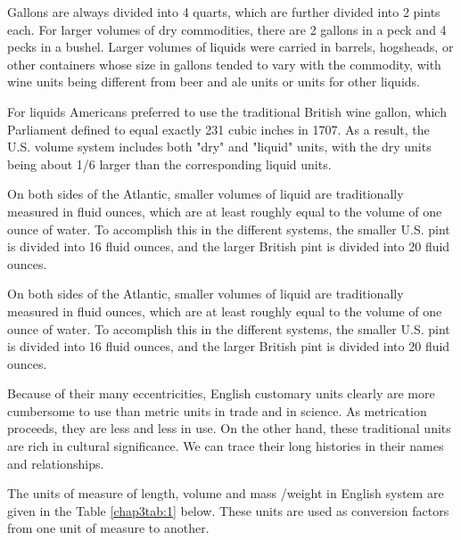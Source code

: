 Gallons are always divided into 4 quarts, which are further divided into 2 pints each.
For larger volumes of dry commodities, there are 2 gallons in a peck and 4 pecks in a bushel.
Larger volumes of liquids were carried in barrels, hogsheads, or other containers whose size
in gallons tended to vary with the commodity, with wine units being different from beer and
ale units or units for other liquids.

For liquids Americans preferred to use the traditional British wine gallon, which
Parliament defined to equal exactly 231 cubic inches in 1707. As a result, the U.S. volume
system includes both "dry" and "liquid" units, with the dry units being about 1/6 larger than
the corresponding liquid units.

On both sides of the Atlantic, smaller volumes of liquid are traditionally measured in
fluid ounces, which are at least roughly equal to the volume of one ounce of water. To
accomplish this in the different systems, the smaller U.S. pint is divided into 16 fluid ounces,
and the larger British pint is divided into 20 fluid ounces.

On both sides of the Atlantic, smaller volumes of liquid are traditionally measured in
fluid ounces, which are at least roughly equal to the volume of one ounce of water. To
accomplish this in the different systems, the smaller U.S. pint is divided into 16 fluid ounces,
and the larger British pint is divided into 20 fluid ounces.

Because of their many eccentricities, English customary units clearly are more
cumbersome to use than metric units in trade and in science. As metrication proceeds, they
are less and less in use. On the other hand, these traditional units are rich in cultural
significance. We can trace their long histories in their names and relationships.

The units of measure of length, volume and mass /weight in English system are given
in the Table \eqref{chap3tab:1} below. These units are used as conversion factors from one unit of measure to
another.

